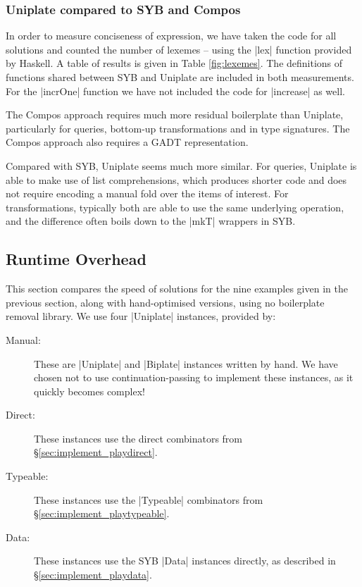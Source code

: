 \documentclass[preprint]{sigplanconf}
\begin{document}
\subsubsection{Uniplate compared to SYB and Compos}

In order to measure conciseness of expression, we have taken the code for all solutions and counted the number of lexemes -- using the |lex| function provided by Haskell. A table of results is given in Table \ref{fig:lexemes}. The definitions of functions shared between SYB and Uniplate are included in both measurements. For the |incrOne| function we have not included the code for |increase| as well.

The Compos approach requires much more residual boilerplate than Uniplate, particularly for queries, bottom-up transformations and in type signatures. The Compos approach also requires a GADT representation.

Compared with SYB, Uniplate seems much more similar. For queries, Uniplate is able to make use of list comprehensions, which produces shorter code and does not require encoding a manual fold over the items of interest. For transformations, typically both are able to use the same underlying operation, and the difference often boils down to the |mkT| wrappers in SYB.


\subsection{Runtime Overhead}
\label{sec:results_speed}

This section compares the speed of solutions for the nine examples given in the previous section, along with hand-optimised versions, using no boilerplate removal library. We use four |Uniplate| instances, provided by:

\begin{description}
\item[Manual:] These are |Uniplate| and |Biplate| instances written by hand. We have chosen not to use continuation-passing to implement these instances, as it quickly becomes complex!
\item[Direct:] These instances use the direct combinators from \S\ref{sec:implement_playdirect}.
\item[Typeable:] These instances use the |Typeable| combinators from \S\ref{sec:implement_playtypeable}.
\item[Data:] These instances use the SYB |Data| instances directly, as described in \S\ref{sec:implement_playdata}.
\end{description}
\end{document}
